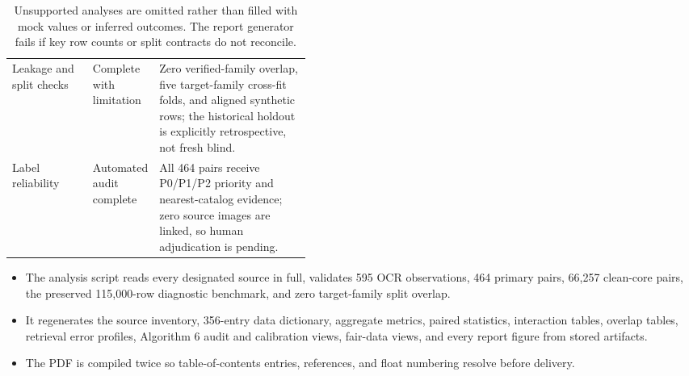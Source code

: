 \documentclass[11pt,a4paper]{article}
\begin{document}
\begin{table}[htbp]
\begin{tabularx}{\linewidth}{@{}L{0.27\linewidth}L{0.16\linewidth}Y@{}}
Leakage and split checks & Complete with limitation & Zero verified-family overlap, five target-family cross-fit folds, and aligned synthetic rows; the historical holdout is explicitly retrospective, not fresh blind. \\
Label reliability & Automated audit complete & All 464 pairs receive P0/P1/P2 priority and nearest-catalog evidence; zero source images are linked, so human adjudication is pending. \\
\bottomrule
\end{tabularx}
\caption{Unsupported analyses are omitted rather than filled with mock values or
inferred outcomes. The report generator fails if key row counts or split
contracts do not reconcile.}
\label{tab:coverage}
\end{table}

\begin{itemize}
  \item The analysis script reads every designated source in full, validates
        595 OCR observations, 464 primary pairs, 66,257 clean-core pairs, the
        preserved 115,000-row diagnostic benchmark, and zero target-family
        split overlap.
  \item It regenerates the source inventory, 356-entry data dictionary,
        aggregate metrics, paired statistics, interaction tables, overlap
        tables, retrieval error profiles, Algorithm 6 audit and calibration
        views, fair-data views, and every report figure from stored artifacts.
  \item The PDF is compiled twice so table-of-contents entries, references, and
        float numbering resolve before delivery.
\end{itemize}
\end{document}
